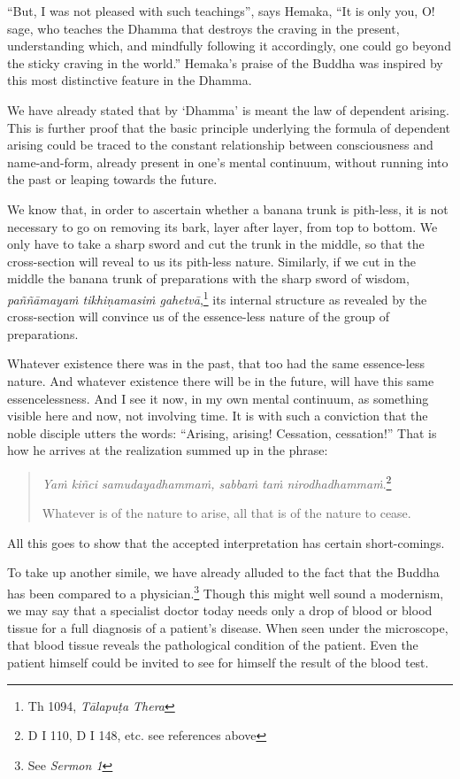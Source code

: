``But, I was not pleased with such teachings'', says Hemaka, ``It is only you, O! sage, who teaches the Dhamma that destroys the craving in the present, understanding which, and mindfully following it accordingly, one could go beyond the sticky craving in the world.'' Hemaka's praise of the Buddha was inspired by this most distinctive feature in the Dhamma.

We have already stated that by `Dhamma' is meant the law of dependent arising. This is further proof that the basic principle underlying the formula of dependent arising could be traced to the constant relationship between consciousness and name-and-form, already present in one's mental continuum, without running into the past or leaping towards the future.

We know that, in order to ascertain whether a banana trunk is pith-less, it is not necessary to go on removing its bark, layer after layer, from top to bottom. We only have to take a sharp sword and cut the trunk in the middle, so that the cross-section will reveal to us its pith-less nature. Similarly, if we cut in the middle the banana trunk of preparations with the sharp sword of wisdom, \emph{paññāmayaṁ tikhiṇamasiṁ gahetvā},\footnote{Th 1094, \emph{Tālapuṭa Thera}} its internal structure as revealed by the cross-section will convince us of the essence-less nature of the group of preparations.

Whatever existence there was in the past, that too had the same essence-less nature. And whatever existence there will be in the future, will have this same essencelessness. And I see it now, in my own mental continuum, as something visible here and now, not involving time. It is with such a conviction that the noble disciple utters the words: ``Arising, arising! Cessation, cessation!'' That is how he arrives at the realization summed up in the phrase:

\begin{quote}
\emph{Yaṁ kiñci samudayadhammaṁ, sabbaṁ taṁ nirodhadhammaṁ}.\footnote{D I 110, D I 148, etc. see references above}

Whatever is of the nature to arise, all that is of the nature to cease.
\end{quote}

All this goes to show that the accepted interpretation has certain short-comings.

To take up another simile, we have already alluded to the fact that the Buddha has been compared to a physician.\footnote{See \emph{Sermon 1}} Though this might well sound a modernism, we may say that a specialist doctor today needs only a drop of blood or blood tissue for a full diagnosis of a patient's disease. When seen under the microscope, that blood tissue reveals the pathological condition of the patient. Even the patient himself could be invited to see for himself the result of the blood test.

